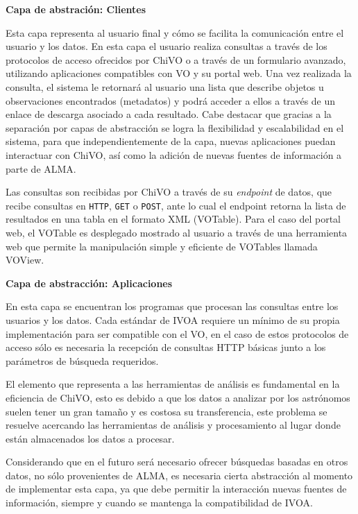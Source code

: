 \textbf{Capa de abstración: Clientes}

Esta capa representa al usuario final y cómo se facilita la comunicación entre el
usuario y los datos.
En esta capa el usuario realiza consultas a través de los protocolos de acceso
ofrecidos por ChiVO o a través de un formulario avanzado, utilizando aplicaciones
compatibles con VO y su portal web.
Una vez realizada la consulta, el sistema le retornará al usuario una lista que
describe objetos u observaciones encontrados (metadatos) y podrá acceder a ellos a
través de un enlace de descarga asociado a cada resultado.
Cabe destacar que gracias a la separación por capas de abstracción se logra la
flexibilidad y escalabilidad en el sistema, para que independientemente de la capa,
nuevas aplicaciones puedan interactuar con ChiVO, así como la adición de nuevas
fuentes de información a parte de ALMA.

Las consultas son recibidas por ChiVO a través de su \emph{endpoint} de datos, que
recibe consultas en \texttt{HTTP}, \texttt{GET} o \texttt{POST}, ante lo cual el
endpoint retorna la lista de resultados en una tabla en el formato XML (VOTable).
Para el caso del portal web, el VOTable es desplegado mostrado al usuario a través
de una herramienta web que permite la manipulación simple y eficiente de VOTables
llamada VOView.

\textbf{Capa de abstracción: Aplicaciones}

En esta capa se encuentran los programas que procesan las consultas entre los
usuarios y los datos.
Cada estándar de IVOA requiere un mínimo de su propia implementación para ser
compatible con el VO, en el caso de estos protocolos de acceso sólo es necesaria la
recepción de consultas HTTP básicas junto a los parámetros de búsqueda requeridos.

El elemento que representa a las herramientas de análisis es fundamental en la
eficiencia de ChiVO, esto es debido a que los datos a analizar por los astrónomos
suelen tener un gran tamaño y es costosa su transferencia, este problema se
resuelve acercando las herramientas de análisis y procesamiento al lugar donde están
almacenados los datos a procesar.

Considerando que en el futuro será necesario ofrecer búsquedas
basadas en otros datos, no sólo provenientes de ALMA, es necesaria cierta
abstracción al momento de implementar esta capa, ya que debe permitir la interacción
nuevas fuentes de información, siempre y cuando se mantenga la compatibilidad
de IVOA.

